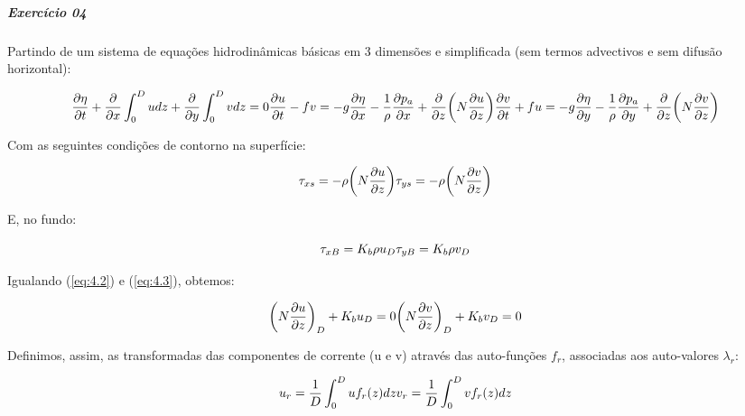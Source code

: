 \documentclass[11pt]{article}
\begin{document}
    \subparagraph{Exercício 04}\label{exercuxedcio-04}

Partindo de um sistema de equações hidrodinâmicas básicas em 3 dimensões
e simplificada (sem termos advectivos e sem difusão horizontal):

\begin{equation}
    \frac{\partial{\eta}}{\partial{t}} + \frac{\partial}{\partial{x}}\int_{0}^{D}udz + \frac{\partial}{\partial{y}}\int_{0}^{D}vdz = 0
    \\
    \frac{\partial{u}}{\partial{t}} - fv = -g\frac{\partial{\eta}}{\partial{x}} - \frac{1}{\rho}\frac{\partial{p_a}}{\partial{x}} + \frac{\partial}{\partial{z}}\bigg( N\frac{\partial{u}}{\partial{z}} \bigg)
    \\
    \frac{\partial{v}}{\partial{t}} + fu = -g\frac{\partial{\eta}}{\partial{y}} - \frac{1}{\rho}\frac{\partial{p_a}}{\partial{y}} + \frac{\partial}{\partial{z}}\bigg( N\frac{\partial{v}}{\partial{z}} \bigg)
    \label{eq:4.1}
\end{equation}

Com as seguintes condições de contorno na superfície:

\begin{equation}
    \tau_{xs} = -\rho\bigg( N\frac{\partial{u}}{\partial{z}} \bigg)
    \\
    \tau_{ys} = -\rho\bigg( N\frac{\partial{v}}{\partial{z}} \bigg)
    \label{eq:4.2}
\end{equation}

E, no fundo:

\begin{equation}
    \tau_{xB} = K_b\rho u_D
    \\
    \tau_{yB} = K_b\rho v_ D
    \label{eq:4.3}
\end{equation}

Igualando (\ref{eq:4.2}) e (\ref{eq:4.3}), obtemos:

\begin{equation}
    \bigg( N\frac{\partial{u}}{\partial{z}} \bigg)_D + K_b u_D = 0
    \\
    \bigg( N\frac{\partial{v}}{\partial{z}} \bigg)_D + K_b v_ D = 0
    \label{eq:4.4}
\end{equation}

Definimos, assim, as transformadas das componentes de corrente (u e v)
através das auto-funções \(f_r\), associadas aos auto-valores
\(\lambda_r\):

\begin{equation}
    u_r = \frac{1}{D}\int^{D}_{0}u f_r(z) dz
    \\
    v_r = \frac{1}{D}\int^{D}_{0}v f_r(z) dz
    \label{eq:4.5}
\end{equation}
\end{document}
